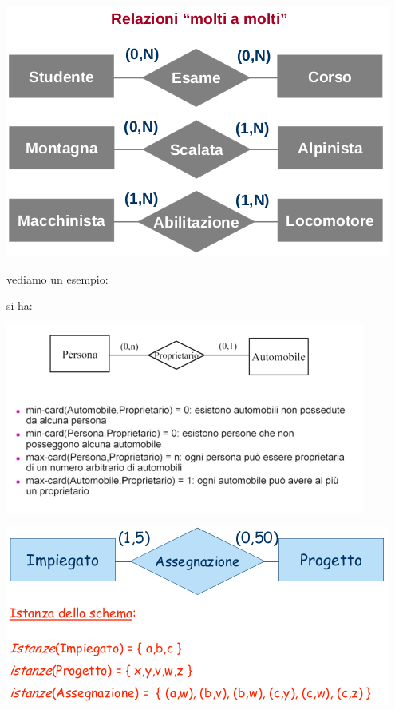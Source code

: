 \documentclass[a4paper,12pt, oneside]{book}
\begin{document}
\begin{center}
	\includegraphics[scale=0.6]{img/er5.png}
\end{center}
vediamo un esempio:
\begin{esempio}
	si ha:
	\begin{center}
		\includegraphics[scale=0.8]{img/er8.png}
	\end{center}

\end{esempio}
\begin{center}
	\includegraphics[scale=0.8]{img/er9.png}
\end{center}
\end{document}
